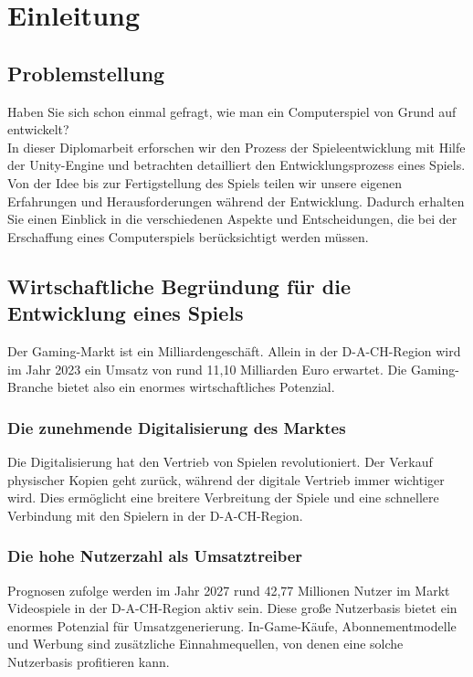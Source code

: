 
\chapter{Einleitung}

\section{Problemstellung}
Haben Sie sich schon einmal gefragt, wie man ein Computerspiel von Grund auf entwickelt?
\\ In dieser Diplomarbeit erforschen wir den Prozess der Spieleentwicklung mit Hilfe der Unity-Engine und betrachten detailliert den Entwicklungsprozess eines Spiels. Von der Idee bis zur Fertigstellung des Spiels teilen wir unsere eigenen Erfahrungen und Herausforderungen während der Entwicklung. Dadurch erhalten Sie einen Einblick in die verschiedenen Aspekte und Entscheidungen, die bei der Erschaffung eines Computerspiels berücksichtigt werden müssen.

\section{Wirtschaftliche Begründung für die Entwicklung eines Spiels}
Der Gaming-Markt ist ein Milliardengeschäft. Allein in der D-A-CH-Region wird im Jahr 2023 ein Umsatz von rund 11,10 Milliarden Euro erwartet. Die Gaming-Branche bietet also ein enormes wirtschaftliches Potenzial.

\subsection{Die zunehmende Digitalisierung des Marktes}
Die Digitalisierung hat den Vertrieb von Spielen revolutioniert. Der Verkauf physischer Kopien geht zurück, während der digitale Vertrieb immer wichtiger wird. Dies ermöglicht eine breitere Verbreitung der Spiele und eine schnellere Verbindung mit den Spielern in der D-A-CH-Region.

\subsection{Die hohe Nutzerzahl als Umsatztreiber}
Prognosen zufolge werden im Jahr 2027 rund 42,77 Millionen Nutzer im Markt Videospiele in der D-A-CH-Region aktiv sein. Diese große Nutzerbasis bietet ein enormes Potenzial für Umsatzgenerierung. In-Game-Käufe, Abonnementmodelle und Werbung sind zusätzliche Einnahmequellen, von denen eine solche Nutzerbasis profitieren kann.

